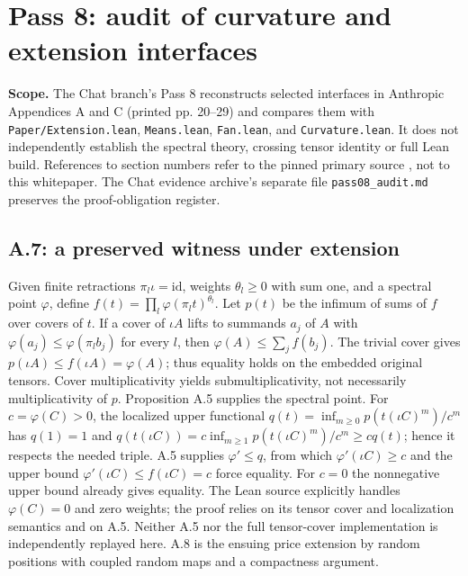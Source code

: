 \documentclass[11pt,letterpaper]{article}
\begin{document}
\endgroup

\section{Pass 8: audit of curvature and extension interfaces}
\label{sec:pass08}
\textbf{Scope.} The Chat branch's Pass 8 reconstructs selected interfaces in Anthropic Appendices A and C (printed pp. 20--29) and compares them with \texttt{Paper/Extension.lean}, \texttt{Means.lean}, \texttt{Fan.lean}, and \texttt{Curvature.lean}. It does not independently establish the spectral theory, crossing tensor identity or full Lean build. References to section numbers refer to the pinned primary source \cite{anthropic}, not to this whitepaper. The Chat evidence archive's separate file \texttt{pass08\_audit.md} preserves the proof-obligation register.

\subsection{A.7: a preserved witness under extension}
Given finite retractions $\pi_l\iota=\mathrm{id}$, weights $\theta_l\ge0$ with sum one, and a spectral point $\varphi$, define $f(t)=\prod_l\varphi(\pi_l t)^{\theta_l}$. Let $p(t)$ be the infimum of sums of $f$ over covers of $t$. If a cover of $\iota A$ lifts to summands $a_j$ of $A$ with $\varphi(a_j)\le\varphi(\pi_l b_j)$ for every $l$, then $\varphi(A)\le\sum_jf(b_j)$. The trivial cover gives $p(\iota A)\le f(\iota A)=\varphi(A)$; thus equality holds on the embedded original tensors. Cover multiplicativity yields submultiplicativity, not necessarily multiplicativity of $p$. Proposition A.5 supplies the spectral point. For $c=\varphi(C)>0$, the localized upper functional $q(t)=\inf_{m\ge0}p(t(\iota C)^m)/c^m$ has $q(1)=1$ and $q(t(\iota C))=c\inf_{m\ge1}p(t(\iota C)^m)/c^m\ge c q(t)$; hence it respects the needed triple. A.5 supplies $\varphi'\le q$, from which $\varphi'(\iota C)\ge c$ and the upper bound $\varphi'(\iota C)\le f(\iota C)=c$ force equality. For $c=0$ the nonnegative upper bound already gives equality. The Lean source explicitly handles $\varphi(C)=0$ and zero weights; the proof relies on its tensor cover and localization semantics and on A.5. Neither A.5 nor the full tensor-cover implementation is independently replayed here. A.8 is the ensuing price extension by random positions with coupled random maps and a compactness argument.
\end{document}
